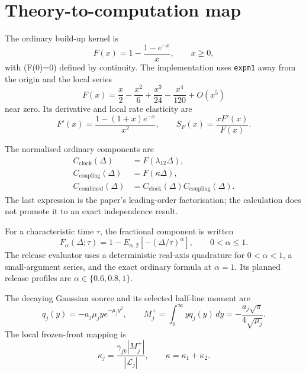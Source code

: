 \documentclass[11pt]{article}
\begin{document}
\section{Theory-to-computation map}

The ordinary build-up kernel is
\begin{equation}
F(x)=1-\frac{1-e^{-x}}{x},\qquad x\geq0,
\label{eq:ordinary}
\end{equation}
with (F(0)=0) defined by continuity. The implementation uses \texttt{expm1} away from the origin and the local series
\begin{equation}
F(x)=\frac{x}{2}-\frac{x^2}{6}+\frac{x^3}{24}-\frac{x^4}{120}+O(x^5)
\end{equation}
near zero. Its derivative and local rate elasticity are
\begin{equation}
F'(x)=\frac{1-(1+x)e^{-x}}{x^2},
\qquad
S_F(x)=\frac{xF'(x)}{F(x)}.
\label{eq:elasticity}
\end{equation}

The normalised ordinary components are
\begin{align}
C_{\mathrm{clock}}(\Delta)&=F(\lambda_{12}\Delta),\\
C_{\mathrm{coupling}}(\Delta)&=F(\kappa\Delta),\\
C_{\mathrm{combined}}(\Delta)&=C_{\mathrm{clock}}(\Delta)C_{\mathrm{coupling}}(\Delta).
\end{align}
The last expression is the paper's leading-order factorisation; the calculation does not promote it to an exact independence result.

For a characteristic time \(\tau\), the fractional component is written
\begin{equation}
F_\alpha(\Delta;\tau)
=1-E_{\alpha,2}\!\left[-(\Delta/\tau)^\alpha\right],
\qquad 0<\alpha\leq1.
\label{eq:fractional}
\end{equation}
The release evaluator uses a deterministic real-axis quadrature for \(0<\alpha<1\), a small-argument series, and the exact ordinary formula at \(\alpha=1\). Its planned release profiles are \(\alpha\in\{0.6,0.8,1\}\).

The decaying Gaussian source and its selected half-line moment are
\begin{equation}
q_j(y)=-a_j\mu_j y e^{-\mu_jy^2},
\qquad
M_j^+=\int_0^\infty yq_j(y)\,dy
=-\frac{a_j\sqrt\pi}{4\sqrt{\mu_j}}.
\label{eq:moment}
\end{equation}
The local frozen-front mapping is
\begin{equation}
\kappa_j=\frac{\gamma_{jk}|M_j^+|}{|\mathcal L_j|},
\qquad
\kappa=\kappa_1+\kappa_2.
\label{eq:response}
\end{equation}
\end{document}
